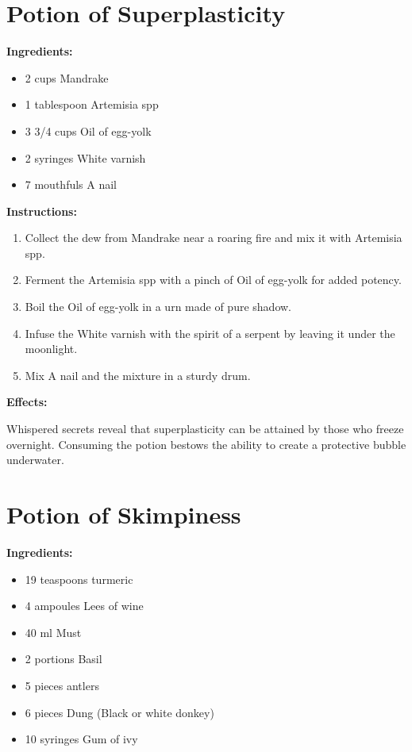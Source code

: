 \documentclass{article}
\begin{document}
\newpage
\section*{Potion of Superplasticity}

\textbf{Ingredients:}

\begin{itemize}
  \item 2 cups Mandrake
  \item 1 tablespoon Artemisia spp
  \item 3 3/4 cups Oil of egg-yolk
  \item 2 syringes White varnish
  \item 7 mouthfuls A nail
\end{itemize}

\textbf{Instructions:}

\begin{enumerate}
  \item Collect the dew from Mandrake near a roaring fire and mix it with Artemisia spp.
  \item Ferment the Artemisia spp with a pinch of Oil of egg-yolk for added potency.
  \item Boil the Oil of egg-yolk in a urn made of pure shadow.
  \item Infuse the White varnish with the spirit of a serpent by leaving it under the moonlight.
  \item Mix A nail and the mixture in a sturdy drum.
\end{enumerate}

\textbf{Effects:}

Whispered secrets reveal that superplasticity can be attained by those who freeze overnight. Consuming the potion bestows the ability to create a protective bubble underwater.

\newpage
\section*{Potion of Skimpiness}

\textbf{Ingredients:}

\begin{itemize}
  \item 19 teaspoons turmeric
  \item 4 ampoules Lees of wine
  \item 40 ml Must
  \item 2 portions Basil
  \item 5 pieces antlers
  \item 6 pieces Dung (Black or white donkey)
  \item 10 syringes Gum of ivy
\end{itemize}
\end{document}
